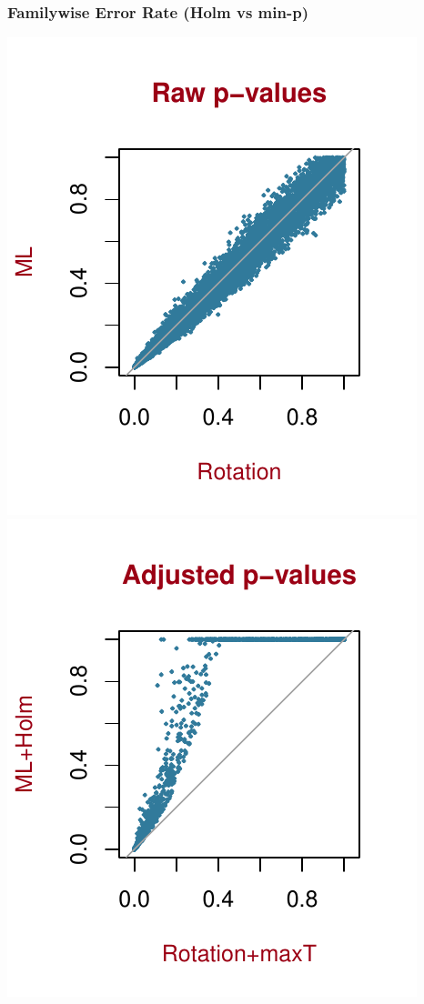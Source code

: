 \documentclass[xcolor={pdftex,dvipsnames,table}]{beamer}
\begin{document}
\begin{frame}[fragile]
\frametitle{Familywise Error Rate (Holm vs min-p)}
\includegraphics[scale=.8]{figures_perm_covariates/compareRaw.pdf}\includegraphics[scale=.8]{figures_perm_covariates/compareAdj.pdf}
\end{frame}
\end{document}
